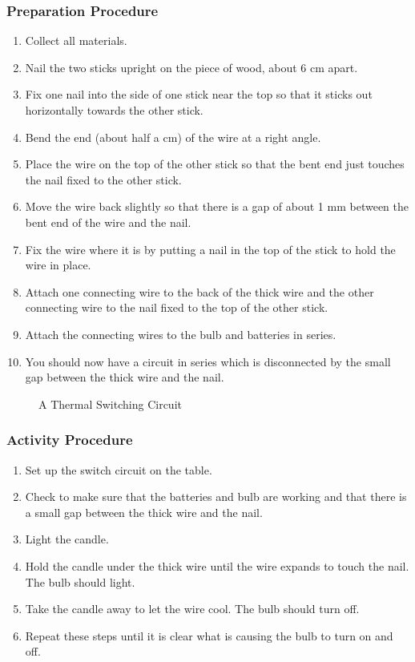 \subsubsection*{Preparation Procedure}
\begin{enumerate}
\item{Collect all materials.} 
\item{Nail the two sticks upright on the piece of wood, about 6 cm apart.} 
\item{Fix one nail into the side of one stick near the top so that it sticks out horizontally towards the other stick.} 
\item{Bend the end (about half a cm) of the wire at a right angle.} 
\item{Place the wire on the top of the other stick so that the bent end just touches the nail fixed to the other stick.} 
\item{Move the wire back slightly so that there is a gap of about 1 mm between the bent end of the wire and the nail.} 
\item{Fix the wire where it is by putting a nail in the top of the stick to hold the wire in place.} 
\item{Attach one connecting wire to the back of the thick wire and the other connecting wire to the nail fixed to the top of the other stick.} 
\item{Attach the connecting wires to the bulb and batteries in series.} 
\item{You should now have a circuit in series which is disconnected by the small gap between the thick wire and the nail.} 
\end{enumerate}

\begin{figure}
\begin{center}
\def\svgwidth{150pt}

\caption{A Thermal Switching Circuit}
\label{fig:thermal-switch}
\end{center}
\end{figure}

\subsubsection*{Activity Procedure}
\begin{enumerate}
\item{Set up the switch circuit on the table.} 
\item{Check to make sure that the batteries and bulb are working and that there is a small gap between the thick wire and the nail.} 
\item{Light the candle.} 
\item{Hold the candle under the thick wire until the wire expands to touch the nail. The bulb should light.} 
\item{Take the candle away to let the wire cool. The bulb should turn off.} 
\item{Repeat these steps until it is clear what is causing the bulb to turn on and off.} 
\end{enumerate}

